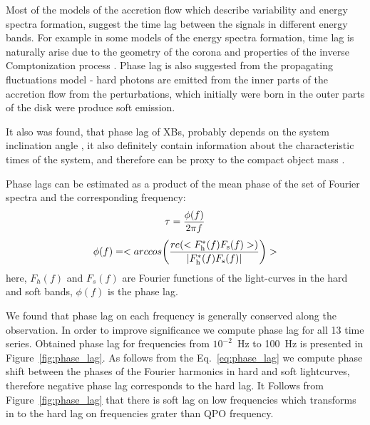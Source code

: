 \documentclass[a4paper,fleqn,usenatbib]{mnras}
\begin{document}
    Most of the models of the accretion flow which describe variability and energy spectra formation, suggest the time lag between the signals in different energy bands. 
For example in some models of the energy spectra formation, time lag is naturally arise due to the geometry of the corona and properties of the inverse Comptonization process \citep[see, e.g.][]{kotov01}.
Phase lag is also suggested from the propagating fluctuations model - hard photons are emitted from the inner parts of the accretion flow from the perturbations, which initially were born in the outer parts of the disk were produce soft emission.  

It also was found, that phase lag of XBs, probably depends on the system inclination angle \citep{eijeden17}, it also definitely contain information about the characteristic times of the system, and therefore can be proxy to the compact object mass \citep{}. 

Phase lags can be estimated as a product of the mean phase of the set of Fourier spectra and the corresponding frequency:
\begin{equation}
                \tau = \frac{\phi(f)}{2\pi f}\\
\end{equation}
\begin{equation}
        \phi(f) = <arccos{\left(\frac{re(<F_{\rm h}^{*}(f)F_{\rm s}(f)>)}{|F_{\rm h}^{*}(f) F_{\rm s}(f)|}\right)}>
        \label{eq:phase_lag}
\end{equation}
here, $F_h(f)$ and $F_s(f)$ are Fourier functions of the light-curves in the hard and soft bands, $\phi(f)$ is the phase lag. 

We found that phase lag on each frequency is generally conserved along the observation.
In order to improve significance we compute phase lag for all 13 time series.
Obtained phase lag for frequencies from $10^{-2}$~Hz to 100~Hz is presented in Figure~\ref{fig:phase_lag}.
As follows from the Eq.~\ref{eq:phase_lag} we compute phase shift between the phases of the Fourier harmonics in hard and soft lightcurves, therefore negative phase lag corresponds to the hard lag.
It Follows from Figure~\ref{fig:phase_lag} that there is soft lag on low frequencies which transforms in to the hard lag on frequencies grater than QPO frequency. 
\end{document}
